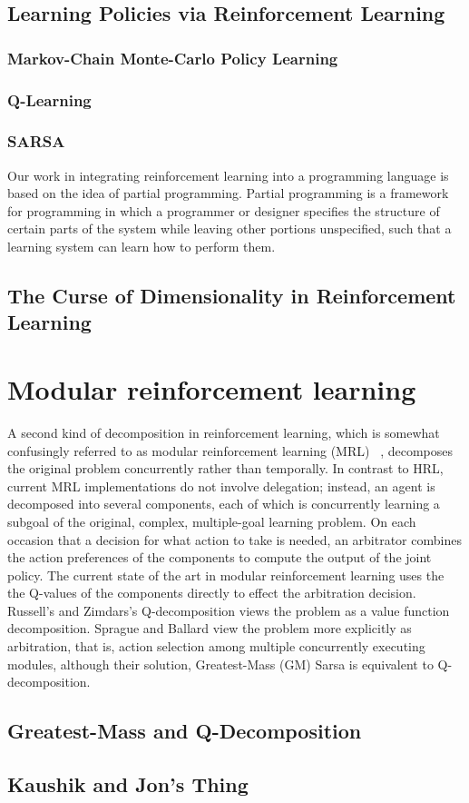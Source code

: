 \subsection{Learning Policies via Reinforcement Learning}

\subsubsection{Markov-Chain Monte-Carlo Policy Learning}

\subsubsection{Q-Learning}

\subsubsection{SARSA}

Our work in integrating reinforcement learning into a programming language is based on the idea of partial programming. Partial programming is a framework for programming in which a programmer or designer specifies the structure of certain parts of the system while leaving other portions unspecified, such that a learning system can learn how to perform them.

\subsection{The Curse of Dimensionality in Reinforcement Learning}


\section{Modular reinforcement learning}

A second kind of decomposition in reinforcement learning, which is somewhat confusingly referred to as modular reinforcement learning (MRL) ~\cite{russell2003q-decomposition,sprague2003multiple-goal}, decomposes the original problem concurrently rather than temporally. In contrast to HRL, current MRL implementations do not involve delegation; instead, an agent is decomposed into several components, each of which is concurrently learning a subgoal of the original, complex, multiple-goal learning problem. On each occasion that a decision for what action to take is needed, an arbitrator combines the action preferences of the components to compute the output of the joint policy.  The current state of the art in modular reinforcement learning uses the the Q-values of the components directly to effect the arbitration decision.  Russell's and Zimdars's Q-decomposition \cite{russell2003q-decomposition} views the problem as a value function decomposition.  Sprague and Ballard view the problem more explicitly as arbitration, that is, action selection among multiple concurrently executing modules, although their solution, Greatest-Mass (GM) Sarsa \cite{sprague2003multiple-goal} is equivalent to Q-decomposition.


\subsection{Greatest-Mass and Q-Decomposition}

\subsection{Kaushik and Jon's Thing}

